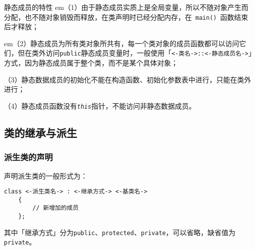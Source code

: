 \documentclass[10pt, a4paper, oneside, fontset=none]{ctexart}
\theoremstyle{plain}
\theoremstyle{definition}
\newcommand{\hang}[1][1]{\hangafter 1 \hangindent #1em}
\newcommand{\zhu}[2][]{\begin{note}{#1}\xiu #2\end{note}}
\begin{document}
\zhu[静态成员的特性]{
	\hang[2]（1）由于静态成员实质上是全局变量，所以不随对象产生而分配，也不随对象销毁而释放，在类声明时已经分配内存，在~\lstinline|main()|~函数结束后才释放；
	
	\hang[2]（2）静态成员为所有类对象所共有，每一个类对象的成员函数都可以访问它们，但在类外访问\texttt{public}静态成员变量时，一般使用「\lstinline[style=qintro]|<-类名->::<-静态成员名->|」方式，因为静态成员属于整个类，而不是某个具体对象；

	（3）静态数据成员的初始化不能在构造函数、初始化参数表中进行，只能在类外进行；

	（4）静态成员函数没有\texttt{\textit{this}}指针，不能访问非静态数据成员。
}

\subsection{类的继承与派生}

\subsubsection{派生类的声明}

声明派生类的一般形式为：
\begin{lstlisting}[style=intro]
	class <-派生类名-> : <-继承方式-> <-基类名->
	{
		// 新增加的成员
	};
\end{lstlisting}
其中「继承方式」分为\texttt{public}、\texttt{protected}、\texttt{private}，可以省略，缺省值为\texttt{private}。
\end{document}
